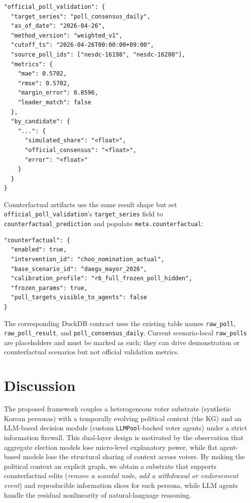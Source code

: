 \documentclass[11pt]{article}
\begin{document}
\begin{verbatim}
"official_poll_validation": {
  "target_series": "poll_consensus_daily",
  "as_of_date": "2026-04-26",
  "method_version": "weighted_v1",
  "cutoff_ts": "2026-04-26T00:00:00+09:00",
  "source_poll_ids": ["nesdc-16198", "nesdc-16200"],
  "metrics": {
    "mae": 0.5702,
    "rmse": 0.5702,
    "margin_error": 0.8596,
    "leader_match": false
  },
  "by_candidate": {
    "...": {
      "simulated_share": "<float>",
      "official_consensus": "<float>",
      "error": "<float>"
    }
  }
}
\end{verbatim}

Counterfactual artifacts use the same result shape but set \texttt{official\_poll\_validation}'s \texttt{target\_series} field to \texttt{counterfactual\_prediction} and populate \texttt{meta.counterfactual}:
\begin{verbatim}
"counterfactual": {
  "enabled": true,
  "intervention_id": "choo_nomination_actual",
  "base_scenario_id": "daegu_mayor_2026",
  "calibration_profile": "r6_full_frozen_poll_hidden",
  "frozen_params": true,
  "poll_targets_visible_to_agents": false
}
\end{verbatim}

The corresponding DuckDB contract uses the existing table names \texttt{raw\_poll}, \texttt{raw\_poll\_result}, and \texttt{poll\_consensus\_daily}. Current scenario-local \texttt{raw\_polls} are placeholders and must be marked as such; they can drive demonstration or counterfactual scenarios but not official validation metrics.

\section{Discussion}

The proposed framework couples a heterogeneous voter substrate (synthetic Korean personas) with a temporally evolving political context (the KG) and an LLM-based decision module (custom \texttt{LLMPool}-backed voter agents) under a strict information firewall. This dual-layer design is motivated by the observation that aggregate election models lose micro-level explanatory power, while flat agent-based models lose the structural sharing of context across voters. By making the political context an explicit graph, we obtain a substrate that supports counterfactual edits (\emph{remove a scandal node}, \emph{add a withdrawal or endorsement event}) and reproducible information slices for each persona, while LLM agents handle the residual nonlinearity of natural-language reasoning.
\end{document}
